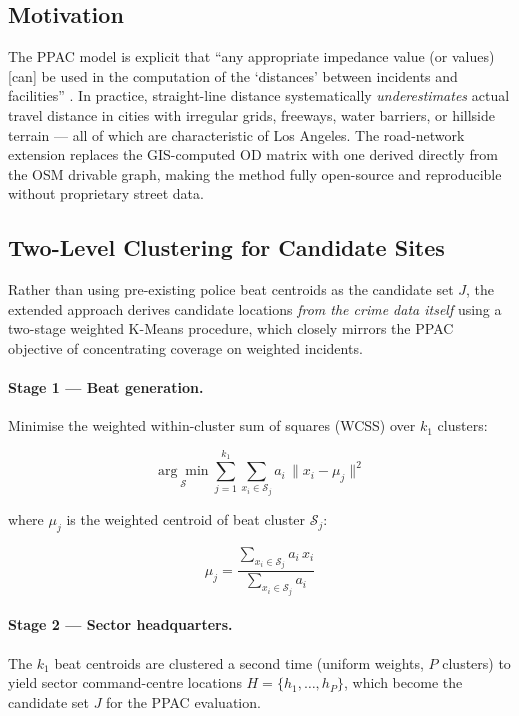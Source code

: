 \documentclass[12pt]{article}
\begin{document}
\subsection{Motivation}

The PPAC model is explicit that ``any appropriate impedance value (or values)
[can] be used in the computation of the `distances' between incidents and
facilities'' \cite{curtin2010}.  In practice, straight-line distance
systematically \emph{underestimates} actual travel distance in cities with
irregular grids, freeways, water barriers, or hillside terrain --- all of
which are characteristic of Los Angeles.  The road-network extension replaces
the GIS-computed OD matrix with one derived directly from the OSM drivable
graph, making the method fully open-source and reproducible without proprietary
street data.

\subsection{Two-Level Clustering for Candidate Sites}

Rather than using pre-existing police beat centroids as the candidate set $J$,
the extended approach derives candidate locations \emph{from the crime data
itself} using a two-stage weighted K-Means procedure, which closely mirrors the
PPAC objective of concentrating coverage on weighted incidents.

\paragraph{Stage 1 --- Beat generation.}
Minimise the weighted within-cluster sum of squares (WCSS) over $k_1$ clusters:

\begin{equation}
    \underset{\mathcal{S}}{\arg\min}
    \sum_{j=1}^{k_1} \sum_{x_i \in \mathcal{S}_j}
    a_i \,\| x_i - \mu_j \|^2
    \label{eq:wcss}
\end{equation}

where $\mu_j$ is the weighted centroid of beat cluster $\mathcal{S}_j$:

\begin{equation}
    \mu_j = \frac{\displaystyle\sum_{x_i \in \mathcal{S}_j} a_i\, x_i}
                 {\displaystyle\sum_{x_i \in \mathcal{S}_j} a_i}
\end{equation}

\paragraph{Stage 2 --- Sector headquarters.}
The $k_1$ beat centroids are clustered a second time (uniform weights,
$P$ clusters) to yield sector command-centre locations $H = \{h_1,\dots,h_P\}$,
which become the candidate set $J$ for the PPAC evaluation.
\end{document}
